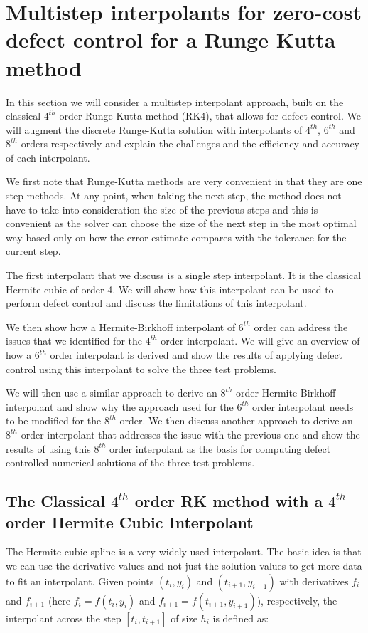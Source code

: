 
\section{Multistep interpolants for zero-cost defect control for a Runge Kutta method}
\label{section:equipping_rk4_with_HBs}
In this section we will consider a multistep interpolant approach, built on the classical $4^{th}$ order Runge Kutta method (RK4), that allows for defect control. We will augment the discrete Runge-Kutta solution with interpolants of $4^{th}$, $6^{th}$ and $8^{th}$ orders respectively and explain the challenges and the efficiency and accuracy of each interpolant. 

We first note that Runge-Kutta methods are very convenient in that they are one step methods. At any point, when taking the next step, the method does not have to take into consideration the size of the previous steps and this is convenient as the solver can choose the size of the next step in the most optimal way based only on how the error estimate compares with the tolerance for the current step. 

The first interpolant that we discuss is a single step interpolant. It is the classical Hermite cubic of order 4. We will show how this interpolant can be used to perform defect control and discuss the limitations of this interpolant. 

We then show how a Hermite-Birkhoff interpolant of $6^{th}$ order can address the issues that we identified for the $4^{th}$ order interpolant. We will give an overview of how a $6^{th}$ order interpolant is derived and show the results of applying defect control using this interpolant to solve the three test problems. 

We will then use a similar approach to derive an $8^{th}$ order Hermite-Birkhoff interpolant and show why the approach used for the $6^{th}$ order interpolant needs to be modified for the $8^{th}$ order. We then discuss another approach to derive an $8^{th}$ order interpolant that addresses the issue with the previous one and show the results of using this $8^{th}$ order interpolant as the basis for computing defect controlled numerical solutions of the three test problems.


\subsection{The Classical $4^{th}$ order RK method with a $4^{th}$ order Hermite Cubic Interpolant}
The Hermite cubic spline is a very widely used interpolant. The basic idea is that we can use the derivative values and not just the solution values to get more data to fit an interpolant. Given points $(t_i, y_i)$ and $(t_{i + 1}, y_{i + 1})$ with derivatives $f_i$ and $f_{i + 1}$ (here $f_i = f(t_i, y_i)$ and $f_{i+1}=f(t_{i+1}, y_{i+1})$), respectively, the interpolant across the step $[t_i, t_{i + 1}]$ of size $h_i$ is defined as:


